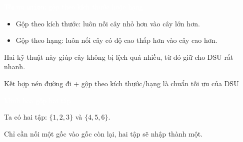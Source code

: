 \documentclass{beamer}
\newcommand{\hlblue}[1]{\textcolor{myblue}{#1}}
\newcommand{\hlgreen}[1]{\textcolor{mygreen}{#1}}
\newcommand{\hlred}[1]{\textcolor{myred}{#1}}
\newcommand{\hlwhite}[1]{\textcolor{white}{#1}}
\begin{document}
\begin{frame}{\hlwhite{Tối ưu \texttt{union}: gộp theo kích thước hoặc hạng}}
\begin{itemize}
  \item \hlblue{Gộp theo kích thước}: luôn nối cây nhỏ hơn vào cây lớn hơn.
  \item \hlgreen{Gộp theo hạng}: luôn nối cây có độ cao thấp hơn vào cây cao hơn.
\end{itemize}

\pause

\begin{tcolorbox}[title=\textbf{\hlgreen{Lợi ích}}]
Hai kỹ thuật này giúp cây không bị lệch quá nhiều, từ đó giữ cho DSU rất nhanh.
\end{tcolorbox}

\begin{tcolorbox}
\centering
\hlred{Kết hợp nén đường đi + gộp theo kích thước/hạng là chuẩn tối ưu của DSU}
\end{tcolorbox}
\end{frame}


\begin{frame}{\hlwhite{Minh họa gộp hai tập}}
\centering
{}

\vspace{0.2cm}
\begin{tcolorbox}[title=\textbf{\hlgreen{Trạng thái trước khi gộp}}]
Ta có hai tập: \(\{1,2,3\}\) và \(\{4,5,6\}\).
\end{tcolorbox}

\pause

\begin{tcolorbox}[title=\textbf{\hlgreen{Sau khi gộp \texttt{union(1,4)}}}]
Chỉ cần nối một gốc vào gốc còn lại, hai tập sẽ nhập thành một.
\end{tcolorbox}
\end{frame}
\end{document}
